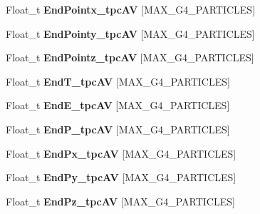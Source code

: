 \begin{DoxyCompactItemize}
\item 
\hypertarget{classanatree_af869b7b410c8f9e23ea42a8e74650894}{Float\-\_\-t {\bfseries End\-Pointx\-\_\-tpc\-A\-V} \mbox{[}M\-A\-X\-\_\-\-G4\-\_\-\-P\-A\-R\-T\-I\-C\-L\-E\-S\mbox{]}}\label{classanatree_af869b7b410c8f9e23ea42a8e74650894}

\item 
\hypertarget{classanatree_aca35df4eeea9f585092b6744f93e62d6}{Float\-\_\-t {\bfseries End\-Pointy\-\_\-tpc\-A\-V} \mbox{[}M\-A\-X\-\_\-\-G4\-\_\-\-P\-A\-R\-T\-I\-C\-L\-E\-S\mbox{]}}\label{classanatree_aca35df4eeea9f585092b6744f93e62d6}

\item 
\hypertarget{classanatree_a88288469c893f3ecc7d10625a5a37b1c}{Float\-\_\-t {\bfseries End\-Pointz\-\_\-tpc\-A\-V} \mbox{[}M\-A\-X\-\_\-\-G4\-\_\-\-P\-A\-R\-T\-I\-C\-L\-E\-S\mbox{]}}\label{classanatree_a88288469c893f3ecc7d10625a5a37b1c}

\item 
\hypertarget{classanatree_a4e1a7bede023edc6626c30d762b31866}{Float\-\_\-t {\bfseries End\-T\-\_\-tpc\-A\-V} \mbox{[}M\-A\-X\-\_\-\-G4\-\_\-\-P\-A\-R\-T\-I\-C\-L\-E\-S\mbox{]}}\label{classanatree_a4e1a7bede023edc6626c30d762b31866}

\item 
\hypertarget{classanatree_a16584dc21d831d967da68d2b7dec4ccf}{Float\-\_\-t {\bfseries End\-E\-\_\-tpc\-A\-V} \mbox{[}M\-A\-X\-\_\-\-G4\-\_\-\-P\-A\-R\-T\-I\-C\-L\-E\-S\mbox{]}}\label{classanatree_a16584dc21d831d967da68d2b7dec4ccf}

\item 
\hypertarget{classanatree_afc7c1fefd00749006c2bb4f3d1b58b5f}{Float\-\_\-t {\bfseries End\-P\-\_\-tpc\-A\-V} \mbox{[}M\-A\-X\-\_\-\-G4\-\_\-\-P\-A\-R\-T\-I\-C\-L\-E\-S\mbox{]}}\label{classanatree_afc7c1fefd00749006c2bb4f3d1b58b5f}

\item 
\hypertarget{classanatree_a8118bff57ec868b5c21473ff56e91fe8}{Float\-\_\-t {\bfseries End\-Px\-\_\-tpc\-A\-V} \mbox{[}M\-A\-X\-\_\-\-G4\-\_\-\-P\-A\-R\-T\-I\-C\-L\-E\-S\mbox{]}}\label{classanatree_a8118bff57ec868b5c21473ff56e91fe8}

\item 
\hypertarget{classanatree_ae56bc5885df964287d74596ca6e4aaf8}{Float\-\_\-t {\bfseries End\-Py\-\_\-tpc\-A\-V} \mbox{[}M\-A\-X\-\_\-\-G4\-\_\-\-P\-A\-R\-T\-I\-C\-L\-E\-S\mbox{]}}\label{classanatree_ae56bc5885df964287d74596ca6e4aaf8}

\item 
\hypertarget{classanatree_a9fb4a6d5e46a409129e5f53dbaee5e55}{Float\-\_\-t {\bfseries End\-Pz\-\_\-tpc\-A\-V} \mbox{[}M\-A\-X\-\_\-\-G4\-\_\-\-P\-A\-R\-T\-I\-C\-L\-E\-S\mbox{]}}\label{classanatree_a9fb4a6d5e46a409129e5f53dbaee5e55}


\end{DoxyCompactItemize}
